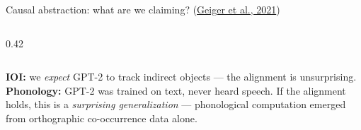 \documentclass[10pt,aspectratio=169]{beamer}
\begin{document}
\begin{frame}{Causal abstraction: what are we claiming? {\scriptsize(\href{https://arxiv.org/abs/2106.02997}{Geiger et al., 2021})}}
\begin{columns}[c]
\begin{column}{0.42\textwidth}
\begin{center}
\end{center}
\end{column}
\end{columns}

\vspace{0.5em}
\textbf{IOI:} we \emph{expect} GPT-2 to track indirect objects --- the alignment is unsurprising.\\[3pt]
\textbf{Phonology:} GPT-2 was trained on text, never heard speech. If the alignment holds, this is a \emph{surprising generalization} --- phonological computation emerged from orthographic co-occurrence data alone.
\end{frame}
\end{document}
